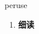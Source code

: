 
\begin{frame}
{\huge peruse}
\begin{center}
\begin{enumerate}\Large
  \item \textbf{细读}
\end{enumerate}
\end{center}
\end{frame}
